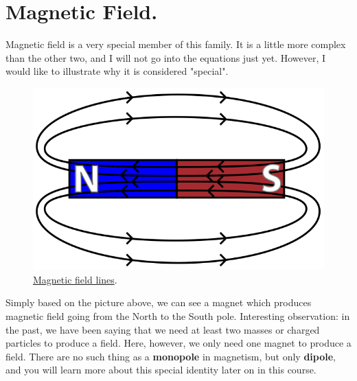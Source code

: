 \documentclass[11pt, letterpaper]{article}
\begin{document}
\section{Magnetic Field.}


		Magnetic field is a very special member of this family. It is a little more complex than the 
		other two, and I will not go into the equations just yet. However, I would like to illustrate why 
		it is considered "special".
		
		\begin{figure}[h!]
			\centering
			\includegraphics[scale=0.5]{magnetic-field-lines}
			\caption{\href{https://www.aplusphysics.com/courses/honors/magnets/magfields.html}
			{Magnetic field lines}.}
			\label{fig:magnetic}
		\end{figure}
		
		Simply based on the picture above, we can see a magnet which produces magnetic field 
		going from the North to the South pole. Interesting observation: in the past, we have 
		been saying that we need at least two masses or charged particles to produce a
		field. Here, however, we only need one magnet to produce a field. There are no such thing
		as a \textbf{monopole} in magnetism, but only \textbf{dipole}, and you will learn more about 
		this special identity later on in this course. 
\end{document}
